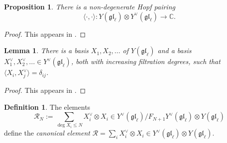 \documentclass[11pt]{report}
\newtheorem{lemma}[theorem]{Lemma}
\newtheorem{prop}[theorem]{Proposition}
\theoremstyle{definition}
\newtheorem{definition}[theorem]{Definition}
\theoremstyle{remark}
\theoremstyle{remark}
\newcommand{\End}{\operatorname{End}}
\newcommand{\Z}{\mathbb{Z}}
\newcommand{\C}{\mathbb{C}}
\begin{document}
\begin{prop}
There is a non-degenerate Hopf pairing
\begin{equation*}
\langle \cdot,\cdot \rangle: Y(\mathfrak{gl}_\ell) \otimes Y^\vee(\mathfrak{gl}_\ell) \to \C.
\end{equation*}
\end{prop}

\begin{proof}
This appears in \cite{article:nazarov:2019}.
\end{proof}

\begin{lemma}
There is a basis $X_1,X_2,...$ of $Y(\mathfrak{gl}_\ell)$ and a basis $X_1^\vee,X_2^\vee,... \in Y^\vee(\mathfrak{gl}_\ell)$, both with increasing filtration degrees, such that $\langle X_i,X_j^\vee \rangle = \delta_{ij}$.
\end{lemma}

\begin{proof}
This appears in \cite{article:nazarov:2019}.
\end{proof}

\begin{definition}
The elements
\begin{equation}\label{equation:universalRMatrixN}
\mathcal{R}_N := \sum_{\deg X_i \leq N} X_i^\vee \otimes X_i \in Y^\vee(\mathfrak{gl}_\ell)/F_{N+1} Y^\vee(\mathfrak{gl}_\ell) \otimes Y(\mathfrak{gl}_\ell)
\end{equation}
define the \emph{canonical element} $\mathcal{R} = \sum_i X_i^\vee \otimes X_i \in Y^\vee(\mathfrak{gl}_\ell) \otimes Y(\mathfrak{gl}_\ell)$.
\end{definition}

%
 
\end{document}
